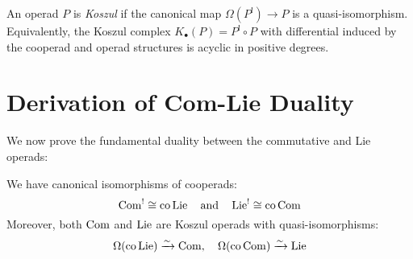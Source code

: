 \begin{definition}
An operad $P$ is \emph{Koszul} if the canonical map $\Omega(P^!) \to P$ is a quasi-isomorphism. Equivalently, the Koszul complex $K_\bullet(P) = P^! \circ P$ with differential induced by the cooperad and operad structures is acyclic in positive degrees.
\end{definition}
 
\section{Derivation of Com-Lie Duality}
 
We now prove the fundamental duality between the commutative and Lie operads:
 
\begin{theorem}\label{thm:com-lie}
We have canonical isomorphisms of cooperads:
\[
\operatorname{Com}^! \cong \text{co}\operatorname{Lie} \quad \text{and} \quad \operatorname{Lie}^! \cong \text{co}\operatorname{Com}
\]
Moreover, both $\operatorname{Com}$ and $\operatorname{Lie}$ are Koszul operads with quasi-isomorphisms:
\[
\Omega(\text{co}\operatorname{Lie}) \xrightarrow{\sim} \operatorname{Com}, \quad \Omega(\text{co}\operatorname{Com}) \xrightarrow{\sim} \operatorname{Lie}
\]
\end{theorem}
 
